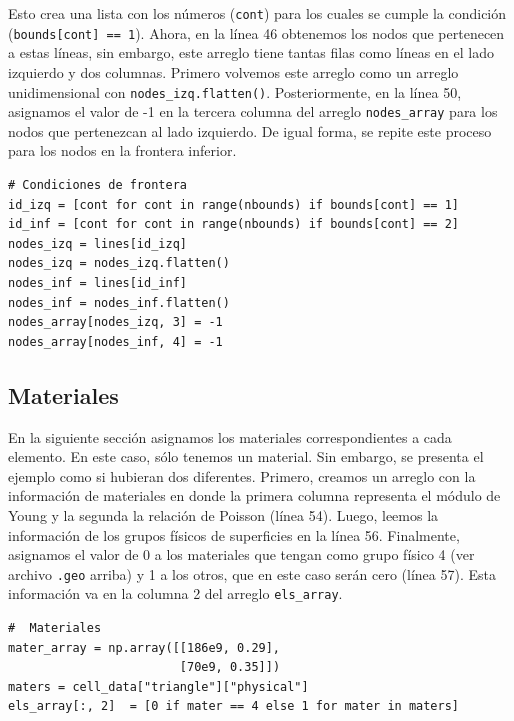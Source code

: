 \documentclass[12pt,letterpaper]{article}
\newcommand{\mintpy}[1]{\texttt{#1}}
\begin{document}

Esto crea una lista con los números (\mintpy{cont}) para los cuales se cumple la condición (\mintpy{bounds[cont] == 1}). Ahora, en la línea 46 obtenemos los nodos que pertenecen a estas líneas, sin embargo, este arreglo tiene tantas filas como líneas en el lado izquierdo y dos columnas. Primero volvemos este arreglo como un arreglo unidimensional con \mintpy{nodes_izq.flatten()}. Posteriormente, en la línea 50, asignamos el valor de -1 en la tercera columna del arreglo \mintpy{nodes_array} para los nodos que pertenezcan al lado izquierdo. De igual forma, se repite este proceso para los nodos en la frontera inferior.
\begin{verbatim}
# Condiciones de frontera
id_izq = [cont for cont in range(nbounds) if bounds[cont] == 1]
id_inf = [cont for cont in range(nbounds) if bounds[cont] == 2]
nodes_izq = lines[id_izq]
nodes_izq = nodes_izq.flatten()
nodes_inf = lines[id_inf]
nodes_inf = nodes_inf.flatten()
nodes_array[nodes_izq, 3] = -1
nodes_array[nodes_inf, 4] = -1
\end{verbatim}

\subsection{Materiales}
En la siguiente sección asignamos los materiales correspondientes a cada elemento. En este caso, sólo tenemos un material. Sin embargo, se presenta el ejemplo como si hubieran dos diferentes.  Primero, creamos un arreglo con la información de materiales en donde la primera columna representa el módulo de Young y la segunda la relación de Poisson (línea 54). Luego, leemos la información de los grupos físicos de superficies en la línea 56. Finalmente, asignamos el valor de 0 a los materiales que tengan como grupo físico 4 (ver archivo \texttt{.geo} arriba) y 1 a los otros, que en este caso serán cero (línea 57). Esta información va en la columna 2 del arreglo \mintpy{els_array}.
\begin{verbatim}
#  Materiales
mater_array = np.array([[186e9, 0.29],
                        [70e9, 0.35]])
maters = cell_data["triangle"]["physical"]
els_array[:, 2]  = [0 if mater == 4 else 1 for mater in maters]
\end{verbatim}
\end{document}
